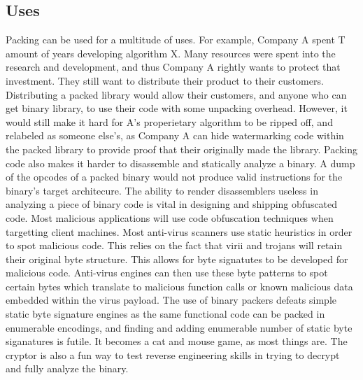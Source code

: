 \documentclass{article}
\begin{document}
\subsection{Uses}
Packing can be used for a multitude of uses. For example, Company A spent T amount of years developing algorithm X. Many resources were spent into the research and development, and thus Company A rightly wants to protect that investment. They still want to distribute their product to their customers. Distributing a packed library would allow their customers, and anyone who can get binary library, to use their code with some unpacking overhead. However, it would still make it hard for A's properietary algorithm to be ripped off, and relabeled as someone else's, as Company A can hide watermarking code within the packed library to provide proof that their originally made the library. Packing code also makes it harder to disassemble and statically analyze a binary. A dump of the opcodes of a packed binary would not produce valid instructions for the binary's target architecure. The ability to render disassemblers useless in analyzing a piece of binary code is vital in designing and shipping obfuscated code. Most malicious applications will use code obfuscation techniques when targetting client machines. Most anti-virus scanners use static heuristics in order to spot malicious code. This relies on the fact that virii and trojans will retain their original byte structure. This allows for byte signatutes to be developed for malicious code. Anti-virus engines can then use these byte patterns to spot certain bytes which translate to malicious function calls or known malicious data embedded within the virus payload. The use of binary packers defeats simple static byte signature engines as the same functional code can be packed in enumerable encodings, and finding and adding enumerable number of static byte siganatures is futile. It becomes a cat and mouse game, as most things are. The cryptor is also a fun way to test reverse engineering skills in trying to decrypt and fully analyze the binary. \newline
\end{document}
